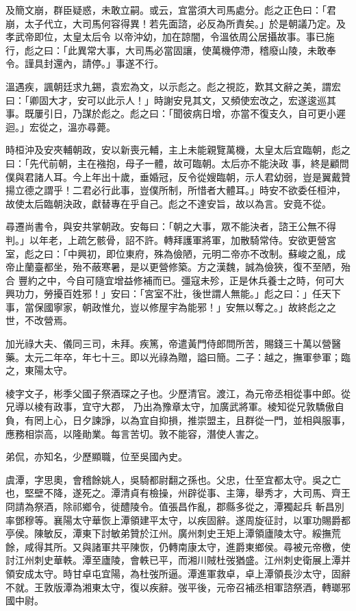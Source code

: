 \begin{pinyinscope}
 及簡文崩，群臣疑惑，未敢立嗣。或云，宜當須大司馬處分。彪之正色曰：「君崩，太子代立，大司馬何容得異！若先面諮，必反為所責矣。」於是朝議乃定。及孝武帝即位，太皇太后令
 以帝沖幼，加在諒闇，令溫依周公居攝故事。事已施行，彪之曰：「此異常大事，大司馬必當固讓，使萬機停滯，稽廢山陵，未敢奉令。謹具封還內，請停。」事遂不行。



 溫遇疾，諷朝廷求九錫，袁宏為文，以示彪之。彪之視訖，歎其文辭之美，謂宏曰：「卿固大才，安可以此示人！」時謝安見其文，又頻使宏改之，宏遂逡巡其事。既屢引日，乃謀於彪之。彪之曰：「聞彼病日增，亦當不復支久，自可更小遲迴。」宏從之，溫亦尋薨。



 時桓沖及安夾輔朝政，安以新喪元輔，主上未能親覽萬機，太皇太后宜臨朝，彪之曰：「先代前朝，主在襁抱，母子一體，故可臨朝。太后亦不能決政
 事，終是顧問僕與君諸人耳。今上年出十歲，垂婚冠，反令從嫂臨朝，示人君幼弱，豈是翼戴贊揚立德之謂乎！二君必行此事，豈僕所制，所惜者大體耳。」時安不欲委任桓沖，故使太后臨朝決政，獻替專在乎自己。彪之不達安旨，故以為言。安竟不從。



 尋遷尚書令，與安共掌朝政。安每曰：「朝之大事，眾不能決者，諮王公無不得判。」以年老，上疏乞骸骨，詔不許。轉拜護軍將軍，加散騎常侍。安欲更營宮室，彪之曰：「中興初，即位東府，殊為儉陋，元明二帝亦不改制。蘇峻之亂，成帝止蘭臺都坐，殆不蔽寒暑，是以更營修築。方之漢魏，誠為儉狹，復不至陋，殆合
 豐約之中，今自可隨宜增益修補而已。彊寇未殄，正是休兵養士之時，何可大興功力，勞擾百姓邪！」安曰：「宮室不壯，後世謂人無能。」彪之曰：」任天下事，當保國寧家，朝政惟允，豈以修屋宇為能邪！」安無以奪之。」故終彪之之世，不改營焉。



 加光祿大夫、儀同三司，未拜。疾篤，帝遣黃門侍郎問所苦，賜錢三十萬以營醫藥。太元二年卒，年七十三。即以光祿為贈，謚曰簡。二子：越之，撫軍參軍；臨之，東陽太守。



 棱字文子，彬季父國子祭酒琛之子也。少歷清官。渡江，為元帝丞相從事中郎。從兄導以棱有政事，宜守大郡，
 乃出為豫章太守，加廣武將軍。棱知從兄敦驕傲自負，有罔上心，日夕諫諍，以為宜自抑損，推崇盟主，且群從一門，並相與服事，應務相崇高，以隆勛業。每言苦切。敦不能容，潛使人害之。



 弟侃，亦知名，少歷顯職，位至吳國內史。



 虞潭，字思奧，會稽餘姚人，吳騎都尉翻之孫也。父忠，仕至宜都太守。吳之亡也，堅壁不降，遂死之。潭清貞有檢操，州辟從事、主簿，舉秀才，大司馬、齊王冏請為祭酒，除祁鄉令，徙醴陵令。值張昌作亂，郡縣多從之，潭獨起兵
 斬昌別率鄧穆等。襄陽太守華恢上潭領建平太守，以疾固辭。遂周旋征討，以軍功賜爵都亭侯。陳敏反，潭東下討敏弟贊於江州。廣州刺史王矩上潭領廬陵太守。綏撫荒餘，咸得其所。又與諸軍共平陳恢，仍轉南康太守，進爵東鄉侯。尋被元帝檄，使討江州刺史華軼。潭至廬陵，會軼已平，而湘川賊杜弢猶盛。江州刺史衛展上潭并領安成太守。時甘卓屯宜陽，為杜弢所逼。潭進軍救卓，卓上潭領長沙太守，固辭不就。王敦版潭為湘東太守，復以疾辭。弢平後，元帝召補丞相軍諮祭酒，轉瑯邪國中尉。




\end{pinyinscope}
